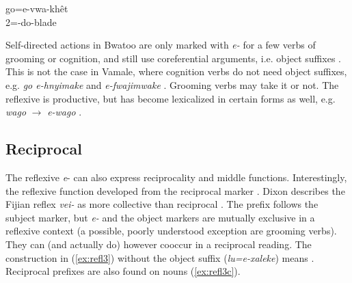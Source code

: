 
\ea
\label{ex:refl2}
\gll go=e-vwa-khêt\\ 
 2=-do-blade\\ 
\glt {}
\z

%
 

Self-directed actions in Bwatoo are only marked with \textit{e-} for a few verbs of grooming or cognition, and still use coreferential arguments, i.e. object suffixes \parencite[34]{bril_semantic_2005b}. This is not the case in Vamale, where cognition verbs do not need object suffixes, e.g. \textit{go e-hnyimake}   and \textit{e-fwajimwake}  . Grooming verbs may take it or not. 
The reflexive is productive, but has become lexicalized in certain forms as well, e.g. \textit{wago}  $\rightarrow$ \textit{e-wago} .


\subsection{Reciprocal}
\label{ssec:recp}
The reflexive \textit{e}- can also express reciprocality and middle functions. 
Interestingly, the reflexive function developed from the reciprocal marker \parencite[26]{bril_semantic_2005b}. Dixon describes the Fijian reflex \textit{vei-} as more collective than reciprocal \parencite[256]{dixon_grammar_1988}.
The prefix follows the subject marker, but \textit{e-} and the object markers are mutually exclusive in a reflexive context (a possible, poorly understood exception are grooming verbs). They can (and actually do) however cooccur in a reciprocal reading. The construction in (\ref{ex:refl3}) without the object suffix (\textit{lu=e-xaleke}) means . Reciprocal prefixes are also found on nouns (\ref{ex:refl3c}). 

